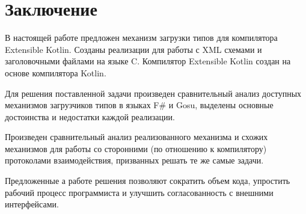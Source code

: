 \clearpage
\section{Заключение}
В настоящей работе предложен механизм загрузки типов для компилятора Extensible Kotlin.
Созданы реализации для работы с XML схемами и заголовочными файлами на языке C.
Компилятор Extensible Kotlin создан на основе компилятора Kotlin.

Для решения поставленной задачи произведен сравнительный анализ доступных механизмов загрузчиков типов в языках
F\# и Gosu, выделены основные достоинства и недостатки каждой реализации.

Произведен сравнительный анализ реализованного механизма и схожих механизмов для работы со сторонними
(по отношению к компилятору) протоколами взаимодействия, призванных решать те же самые задачи.

Предложенные а работе решения позволяют сократить объем кода, упростить рабочий процесс программиста и улучшить согласованность с внешними интерфейсами.

\clearpage